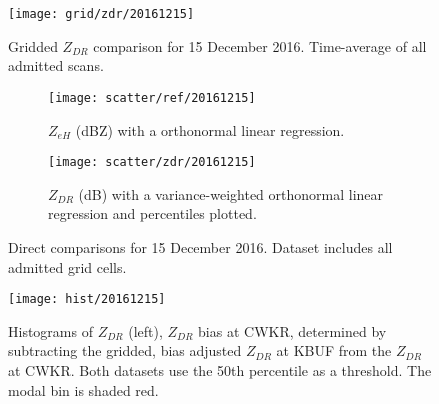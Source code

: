 \begin{figure}[p]
\texttt{[image: grid/zdr/20161215]}
\caption{Gridded $Z_{DR}$ comparison for 15 December 2016. Time-average of all admitted scans.} 
\label{fig:grid_zdr_20161215}
\end{figure}

\begin{figure}[p]
\centering
   \begin{subfigure}[t]{0.48\linewidth} \centering
     \texttt{[image: scatter/ref/20161215]}
     \caption{$Z_{eH}$ (dBZ) with a orthonormal linear regression.}\label{fig:scatter_ref_20161215}
   \end{subfigure}
   \begin{subfigure}[t]{0.48\linewidth} \centering
     \texttt{[image: scatter/zdr/20161215]}
     \caption{$Z_{DR}$ (dB) with a variance-weighted orthonormal linear regression and percentiles plotted.}\label{fig:scatter_zdr_20161215}
   \end{subfigure}
\caption{Direct comparisons for 15 December 2016. Dataset includes all admitted grid cells.} \label{fig:scatter_20161215}
\end{figure}

\begin{figure}[H]
\texttt{[image: hist/20161215]}\centering
\caption{Histograms of $Z_{DR}$ (left), $Z_{DR}$ bias at CWKR, determined by subtracting the gridded, bias adjusted $Z_{DR}$ at KBUF from the $Z_{DR}$ at
CWKR. Both datasets use the 50th percentile as a threshold. The modal bin is shaded red. } 
\label{fig:hist_20161215}
\end{figure}

